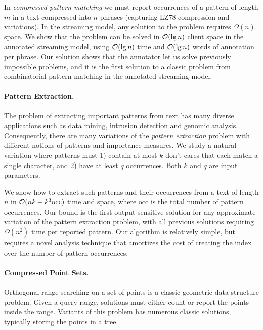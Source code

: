 In \emph{compressed pattern matching} we must report occurrences of a pattern of length $m$ in a text compressed into $n$ phrases (capturing LZ78 compression and variations). In the streaming model, any solution to the problem requires $\Omega(n)$ space.
We show that the problem can be solved in $\mathcal{O}(\lg n)$ client space in the annotated streaming model, using $\mathcal{O}(\lg n)$ time and $\mathcal{O}(\lg n)$ words of annotation per phrase. Our solution shows that the annotator let us solve previously impossible problems, and it is the first solution to a classic problem from combinatorial pattern matching in the annotated streaming model. 


\paragraph{Pattern Extraction.}
The problem of extracting important patterns from text has many diverse applications such as data mining, intrusion detection and genomic analysis. Consequently, there are many variations of the \emph{pattern extraction} problem with different notions of patterns and importance measures. We study a natural variation where patterns must 1) contain at most $k$ don't cares that each match a single character, and 2) have at least $q$ occurrences. Both $k$ and $q$ are input parameters.

We show how to extract such patterns and their occurrences from a text of length $n$ in $\mathcal{O}(nk + k^3 \textrm{occ})$ time and space, where $\textrm{occ}$ is the total number of pattern occurrences. 
Our bound is the first output-sensitive solution for any approximate variation of the pattern extraction problem, with all previous solutions requiring $\Omega(n^2)$ time per reported pattern. Our algorithm is relatively simple, but requires a novel analysis technique that amortizes the cost of creating the index over the number of pattern occurrences.



\paragraph{Compressed Point Sets.}
Orthogonal range searching on a set of points is a classic geometric data structure problem. Given a query range, solutions must either count or report the points inside the range. Variants of this problem has numerous classic solutions, typically storing the points in a tree.

